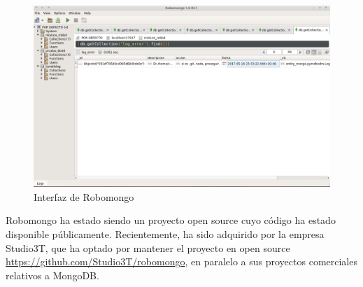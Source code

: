 \begin{figure}[H]
   \centering
   \includegraphics[width=16cm]{img/robomongo}
   \caption{Interfaz de Robomongo}
   \label{figura:robomongo}
\end{figure}


Robomongo ha estado siendo un proyecto open source cuyo código ha estado disponible públicamente. Recientemente, ha sido adquirido por la empresa Studio3T, que ha optado por mantener el proyecto en  open source \url{https://github.com/Studio3T/robomongo}, en paralelo a sus proyectos comerciales relativos a MongoDB.
